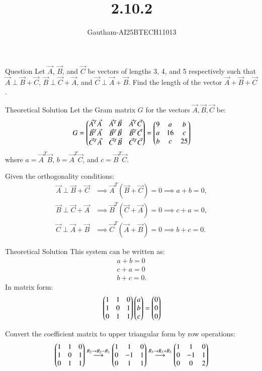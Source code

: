 \documentclass{beamer}
\title %
{2.10.2}
\author %
{Gautham-AI25BTECH11013}
\begin{document}
\frame{\titlepage}
\begin{frame}{Question}
Let $\Vec{A}$, $\Vec{B}$, and $\Vec{C}$ be vectors of lengths 3, 4, and 5 respectively such that
$\Vec{A} \perp \Vec{B} + \Vec{C}$, 
$\Vec{B} \perp \Vec{C} + \Vec{A}$, and
$\Vec{C} \perp \Vec{A} + \Vec{B}$. Find the length of the vector $\Vec{A} + \Vec{B} + \Vec{C}$.\\
\end{frame}
\begin{frame}{Theoretical Solution}
Let the Gram matrix $G$ for the vectors $\Vec{A}, \Vec{B}, \Vec{C}$ be:
\begin{align}
G = \begin{pmatrix}
\Vec{A}^T \Vec{A} & \Vec{A}^T \Vec{B} & \Vec{A}^T \Vec{C} \\
\Vec{B}^T \Vec{A} & \Vec{B}^T \Vec{B} & \Vec{B}^T \Vec{C} \\
\Vec{C}^T \Vec{A} & \Vec{C}^T \Vec{B} & \Vec{C}^T \Vec{C}
\end{pmatrix}
= \begin{pmatrix}
9 & a & b \\
a & 16 & c \\
b & c & 25
\end{pmatrix}
\end{align}
where $a = \Vec{A}^T \Vec{B}$, $b = \Vec{A}^T \Vec{C}$, and $c = \Vec{B}^T \Vec{C}$.

Given the orthogonality conditions:
\begin{align}
\Vec{A} \perp \Vec{B} + \Vec{C} &\implies \Vec{A}^T (\Vec{B} + \Vec{C}) = 0 \implies a + b = 0, \\
\Vec{B} \perp \Vec{C} + \Vec{A} &\implies \Vec{B}^T (\Vec{C} + \Vec{A}) = 0 \implies c + a = 0, \\
\Vec{C} \perp \Vec{A} + \Vec{B} &\implies \Vec{C}^T (\Vec{A} + \Vec{B}) = 0 \implies b + c = 0.
\end{align}
\end{frame}
\begin{frame}{Theoretical Solution}
 This system can be written as:
\begin{align}
a + b = 0 \\
c + a = 0 \\
b + c = 0.
\end{align}
In matrix form:
\begin{align}
\begin{pmatrix}
1 & 1 & 0 \\
1 & 0 & 1 \\
0 & 1 & 1
\end{pmatrix}
\begin{pmatrix}
a \\ b \\ c
\end{pmatrix}
= \begin{pmatrix}
0 \\ 0 \\ 0
\end{pmatrix}
\end{align}

Convert the coefficient matrix to upper triangular form by row operations:
\begin{align}
\begin{pmatrix}
1 & 1 & 0 \\
1 & 0 & 1 \\
0 & 1 & 1
\end{pmatrix}
\overset{R_2 \to R_2 - R_1}{\longrightarrow}
\begin{pmatrix}
1 & 1 & 0 \\
0 & -1 & 1 \\
0 & 1 & 1
\end{pmatrix}
\overset{R_3 \to R_3 + R_2}{\longrightarrow}
\begin{pmatrix}
1 & 1 & 0 \\
0 & -1 & 1 \\
0 & 0 & 2
\end{pmatrix}
\end{align}
\end{frame}
\end{document}
